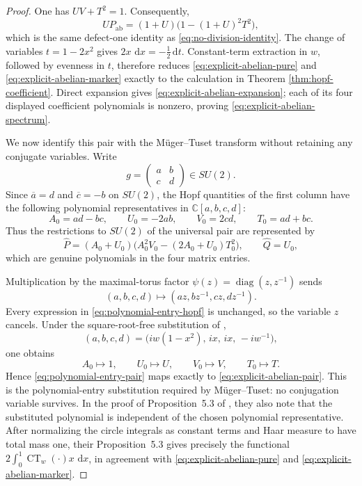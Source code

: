 \documentclass[11pt]{article}
\numberwithin{equation}{section}
\newcommand{\C}{\mathbb C}
\newcommand{\CT}{\operatorname{CT}}
\newcommand{\dd}{\,\mathrm d}
\begin{document}
\begin{proof}
One has $UV+T^2=1$.  Consequently,
\[
 UP_{\mathrm{ab}}
 =(1+U)\bigl(1-(1+U)^2T^2\bigr),
\]
which is the same defect-one identity as \eqref{eq:no-division-identity}.
The change of variables $t=1-2x^2$ gives
$2x\,\dd x=-\tfrac12\dd t$.  Constant-term extraction in $w$, followed by
evenness in $t$, therefore reduces \eqref{eq:explicit-abelian-pure} and
\eqref{eq:explicit-abelian-marker} exactly to the calculation in Theorem
\ref{thm:hopf-coefficient}.  Direct expansion gives
\eqref{eq:explicit-abelian-expansion}; each of its four displayed coefficient
polynomials is nonzero, proving \eqref{eq:explicit-abelian-spectrum}.

We now identify this pair with the M\"uger--Tuset transform without retaining
any conjugate variables.  Write
\[
 g=\begin{pmatrix}a&b\\ c&d\end{pmatrix}\in SU(2).
\]
Since $\overline a=d$ and $\overline c=-b$ on $SU(2)$, the Hopf quantities of
the first column have the following polynomial representatives in
$\C[a,b,c,d]$:
\begin{equation}\label{eq:polynomial-entry-hopf}
 A_0=ad-bc,
 \qquad U_0=-2ab,
 \qquad V_0=2cd,
 \qquad T_0=ad+bc.
\end{equation}
Thus the restrictions to $SU(2)$ of the universal pair are represented by
\begin{equation}\label{eq:polynomial-entry-pair}
 \widehat P=(A_0+U_0)\bigl(A_0^2V_0-(2A_0+U_0)T_0^2\bigr),
 \qquad
 \widehat Q=U_0,
\end{equation}
which are genuine polynomials in the four matrix entries.

Multiplication by the maximal-torus factor
$\psi(z)=\operatorname{diag}(z,z^{-1})$ sends
\[
 (a,b,c,d)\longmapsto(az,bz^{-1},cz,dz^{-1}).
\]
Every expression in \eqref{eq:polynomial-entry-hopf} is unchanged, so the
variable $z$ cancels.
Under the square-root-free substitution of
\cite[Lemma~5.2]{MugerTuset2025},
\[
 (a,b,c,d)
 =\bigl(iw(1-x^2),\,ix,\,ix,\,-iw^{-1}\bigr),
\]
one obtains
\[
 A_0\longmapsto1,
 \qquad U_0\longmapsto U,
 \qquad V_0\longmapsto V,
 \qquad T_0\longmapsto T.
\]
Hence \eqref{eq:polynomial-entry-pair} maps exactly to
\eqref{eq:explicit-abelian-pair}.  This is the polynomial-entry substitution
required by M\"uger--Tuset: no conjugation variable survives.  In the proof
of Proposition~5.3 of \cite{MugerTuset2025}, they also note that the
substituted polynomial is independent of the chosen polynomial
representative.  After normalizing
the circle integrals as constant terms and Haar measure to have total mass
one, their Proposition~5.3 gives precisely the functional
$2\int_0^1\CT_w(\cdot)x\,\dd x$, in agreement with
\eqref{eq:explicit-abelian-pure} and
\eqref{eq:explicit-abelian-marker}.
\end{proof}
\end{document}
